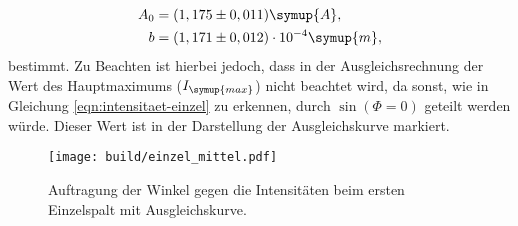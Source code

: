     \begin{align}
        A_0 &= (1,175 \pm 0,011) \symup{A}, \\
        b &= (1,171 \pm 0,012) \cdot 10^{-4} \symup{m}, 
    \end{align}
    bestimmt. Zu Beachten ist hierbei jedoch, dass in der Ausgleichsrechnung der Wert des Hauptmaximums ($I_{\symup{max}}$)
    nicht beachtet wird, da sonst, wie in Gleichung 
    \eqref{eqn:intensitaet-einzel} zu erkennen, durch $\sin(\Phi = 0)$ geteilt werden würde.
    Dieser Wert ist in der Darstellung der Ausgleichskurve markiert.
    \begin{figure}
        \centering
        \texttt{[image: build/einzel\_mittel.pdf]}
        \caption{Auftragung der Winkel gegen die Intensitäten beim ersten Einzelspalt mit Ausgleichskurve.}
        \label{fig:einzel_mittel}
    \end{figure}
%
%
